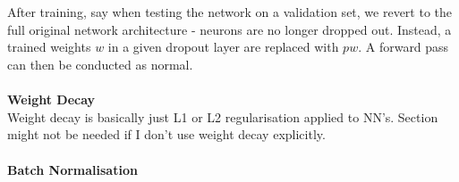 \documentclass[11pt]{article} %
\theoremstyle{plain}
\theoremstyle{definition}
\begin{document}
\\
\\
\noindent
After training, say when testing the network on a validation set, we revert to the full original network architecture - neurons are no longer dropped out. Instead, a trained weights \(w\) in a given dropout layer are replaced with \(pw\). A forward pass can then be conducted as normal. 
\\
\\
\noindent
\textbf{Weight Decay}
\\
\noindent
[TBD] Weight decay is basically just L1 or L2 regularisation applied to NN's. Section might not be needed if I don't use weight decay explicitly.
\\
\\
\noindent
\textbf{Batch Normalisation}
\\
\noindent
[TBD]
\newpage
\end{document}
